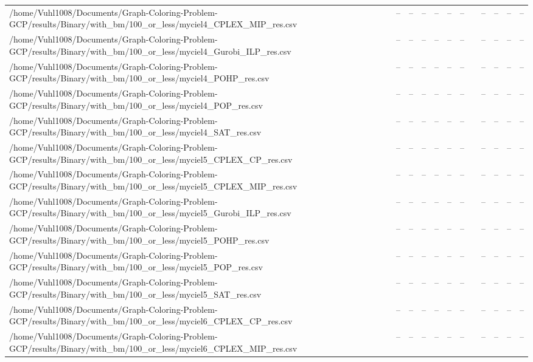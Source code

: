 \begin{table}[htbp]
\begin{tabular}{llllllllllll}
/home/Vuhl1008/Documents/Graph-Coloring-Problem-GCP/results/Binary/with\_bm/100\_or\_less/myciel4\_CPLEX\_MIP\_res.csv & -- & -- & -- & -- & -- & -- & {} & -- & -- & -- & -- \\
/home/Vuhl1008/Documents/Graph-Coloring-Problem-GCP/results/Binary/with\_bm/100\_or\_less/myciel4\_Gurobi\_ILP\_res.csv & -- & -- & -- & -- & -- & -- & {} & -- & -- & -- & -- \\
/home/Vuhl1008/Documents/Graph-Coloring-Problem-GCP/results/Binary/with\_bm/100\_or\_less/myciel4\_POHP\_res.csv & -- & -- & -- & -- & -- & -- & {} & -- & -- & -- & -- \\
/home/Vuhl1008/Documents/Graph-Coloring-Problem-GCP/results/Binary/with\_bm/100\_or\_less/myciel4\_POP\_res.csv & -- & -- & -- & -- & -- & -- & {} & -- & -- & -- & -- \\
/home/Vuhl1008/Documents/Graph-Coloring-Problem-GCP/results/Binary/with\_bm/100\_or\_less/myciel4\_SAT\_res.csv & -- & -- & -- & -- & -- & -- & {} & -- & -- & -- & -- \\
/home/Vuhl1008/Documents/Graph-Coloring-Problem-GCP/results/Binary/with\_bm/100\_or\_less/myciel5\_CPLEX\_CP\_res.csv & -- & -- & -- & -- & -- & -- & {} & -- & -- & -- & -- \\
/home/Vuhl1008/Documents/Graph-Coloring-Problem-GCP/results/Binary/with\_bm/100\_or\_less/myciel5\_CPLEX\_MIP\_res.csv & -- & -- & -- & -- & -- & -- & {} & -- & -- & -- & -- \\
/home/Vuhl1008/Documents/Graph-Coloring-Problem-GCP/results/Binary/with\_bm/100\_or\_less/myciel5\_Gurobi\_ILP\_res.csv & -- & -- & -- & -- & -- & -- & {} & -- & -- & -- & -- \\
/home/Vuhl1008/Documents/Graph-Coloring-Problem-GCP/results/Binary/with\_bm/100\_or\_less/myciel5\_POHP\_res.csv & -- & -- & -- & -- & -- & -- & {} & -- & -- & -- & -- \\
/home/Vuhl1008/Documents/Graph-Coloring-Problem-GCP/results/Binary/with\_bm/100\_or\_less/myciel5\_POP\_res.csv & -- & -- & -- & -- & -- & -- & {} & -- & -- & -- & -- \\
/home/Vuhl1008/Documents/Graph-Coloring-Problem-GCP/results/Binary/with\_bm/100\_or\_less/myciel5\_SAT\_res.csv & -- & -- & -- & -- & -- & -- & {} & -- & -- & -- & -- \\
/home/Vuhl1008/Documents/Graph-Coloring-Problem-GCP/results/Binary/with\_bm/100\_or\_less/myciel6\_CPLEX\_CP\_res.csv & -- & -- & -- & -- & -- & -- & {} & -- & -- & -- & -- \\
/home/Vuhl1008/Documents/Graph-Coloring-Problem-GCP/results/Binary/with\_bm/100\_or\_less/myciel6\_CPLEX\_MIP\_res.csv & -- & -- & -- & -- & -- & -- & {} & -- & -- & -- & -- \\

\end{tabular}
\end{table}
